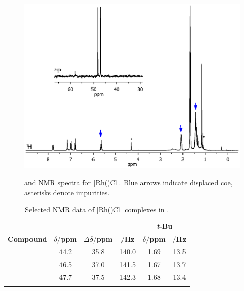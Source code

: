 \begin{figure}[htbp]
\begin{center}
\vspace{0.5cm}
\includegraphics[trim = 2.5cm 4.0cm 2.5cm 15cm, clip]{../NMR/7004B.eps}
\caption[\phosphorus{} and \proton{} NMR spectra for [Rh(\tBuxantphos)Cl{]}]{\phosphorus{} and \proton{} NMR spectra for [Rh(\tBuxantphos)Cl].  Blue arrows indicate displaced \acrshort{coe}, asterisks denote impurities.}
\vspace{0.2cm}
\label{RhClnmr}
\end{center}
\end{figure}
\vspace{0.2cm}

\begin{table}[htbp]
\caption[Selected NMR data of [Rh(\tBuxantphos)Cl{]} complexes]{Selected NMR data of [Rh(\tBuxantphos)Cl] complexes in .}
\vspace{1em}
\label{table:rhodiumchloride}
\small
\begin{center}
\begin{tabular}{c c c c c c}
	\toprule{}
	~ & \multicolumn{3}{c}{\bfseries{\phosphorus}} & \multicolumn{2}{c}{\bfseries{\proton{} \emph{t}-Bu}}\\
	\cmidrule(lr){2-4} \cmidrule(lr){5-6} 
	\bfseries{Compound}&\bfseries{$\delta/$ppm}&\bfseries{$\Delta\delta/$ppm}&\bfseries{\JRhP{}$/$Hz}&\bfseries{$\delta/$ppm}&\bfseries{\J $/$Hz}\\
	\midrule{}
	\tBuSixantphos		&	44.2	&	35.8	&	140.0	& 1.69	& 13.5\\
	\tBuThixantphos	& 	46.5	&	37.0	&	141.5	& 1.67	& 13.7\\
	\tBuXantphos		&	47.7	&	37.5	&	142.3	& 1.68	& 13.4\\
	\bottomrule{}
\end{tabular}
\end{center}
\end{table}

